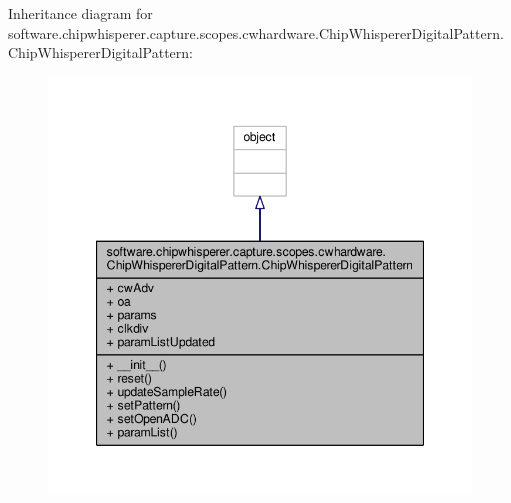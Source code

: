 Inheritance diagram for software.\+chipwhisperer.\+capture.\+scopes.\+cwhardware.\+Chip\+Whisperer\+Digital\+Pattern.\+Chip\+Whisperer\+Digital\+Pattern\+:\nopagebreak
\begin{figure}[H]
\begin{center}
\leavevmode
\includegraphics[width=347pt]{d8/d82/classsoftware_1_1chipwhisperer_1_1capture_1_1scopes_1_1cwhardware_1_1ChipWhispererDigitalPattern8ff46464d868d4035980a42a9ccaf026}
\end{center}
\end{figure}


